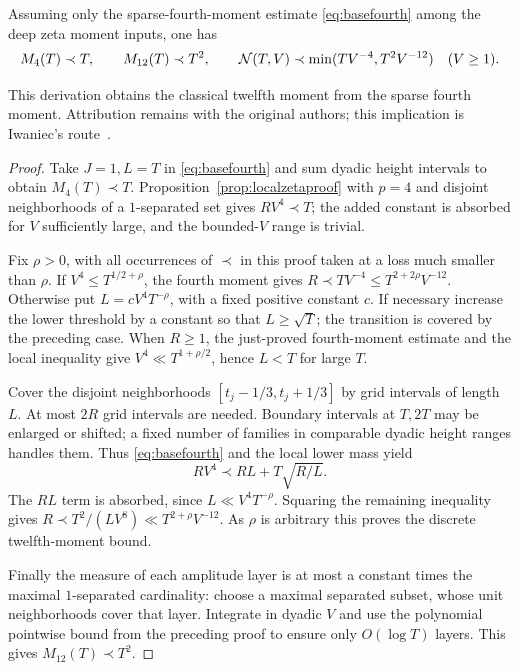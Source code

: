 \begin{proposition}\label{prop:momentbaseproof}
Assuming only the sparse-fourth-moment estimate
\eqref{eq:basefourth} among the deep zeta moment inputs, one has
\[
 M_4(T)\prec T,\qquad M_{12}(T)\prec T^2,\qquad
 \mathcal{N}(T,V)\prec\min(TV^{-4},T^2V^{-12})\quad(V\ge1).
\]
\end{proposition}
This derivation obtains the classical twelfth moment from the
sparse fourth moment. Attribution remains with the original authors;
this implication is Iwaniec's route~\cite{Iwa80}.
\begin{proof}
Take $J=1,L=T$ in \eqref{eq:basefourth} and sum dyadic height intervals
to obtain $M_4(T)\prec T$. Proposition~\ref{prop:localzetaproof}
with $p=4$ and disjoint neighborhoods of a $1$-separated set gives
$RV^4\prec T$; the added constant is absorbed for $V$ sufficiently
large, and the bounded-$V$ range is trivial.

Fix $\rho>0$, with all occurrences of $\prec$ in this proof taken at
a loss much smaller than $\rho$. If $V^4\le T^{1/2+\rho}$, the fourth
moment gives
$R\prec TV^{-4}\le T^{2+2\rho}V^{-12}$.
Otherwise put $L=cV^4T^{-\rho}$, with a fixed positive constant $c$.
If necessary increase the lower threshold by a constant so that
$L\ge\sqrt T$; the transition is covered by the preceding case.
When $R\ge1$, the just-proved fourth-moment estimate and the local
inequality give $V^4\ll T^{1+\rho/2}$, hence $L<T$ for large $T$.

Cover the disjoint neighborhoods $[t_j-1/3,t_j+1/3]$ by grid intervals
of length $L$. At most $2R$ grid intervals are needed. Boundary
intervals at $T,2T$ may be enlarged or shifted; a fixed number of
families in comparable dyadic height ranges handles them. Thus
\eqref{eq:basefourth} and the local lower mass yield
\[
 RV^4\prec RL+T\sqrt{R/L}.
\]
The $RL$ term is absorbed, since $L\ll V^4T^{-\rho}$.
Squaring the remaining inequality gives
$R\prec T^2/(LV^8)\ll T^{2+\rho}V^{-12}$.
As $\rho$ is arbitrary this proves the discrete twelfth-moment bound.

Finally the measure of each amplitude layer is at most a constant times
the maximal $1$-separated cardinality: choose a maximal separated
subset, whose unit neighborhoods cover that layer. Integrate in
dyadic $V$ and use the polynomial pointwise bound from the preceding
proof to ensure only $O(\log T)$ layers. This gives $M_{12}(T)\prec T^2$.
\end{proof}

